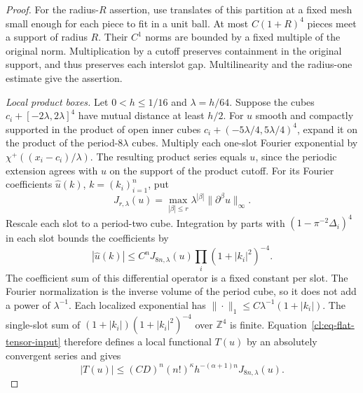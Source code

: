 \documentclass[11pt,letterpaper,reqno]{amsart}
\numberwithin{equation}{section}
\theoremstyle{definition}
\theoremstyle{remark}
\begin{document}
\begin{proof}
For the radius-\(R\) assertion, use translates of this partition
at a fixed mesh small enough for each piece to fit in a unit
ball. At most \(C(1+R)^4\) pieces meet a support of radius \(R\).
Their \(C^1\) norms are bounded by a fixed multiple of the original
norm. Multiplication by a cutoff preserves containment in the
original support, and thus preserves each interslot gap.
Multilinearity and the radius-one estimate give the assertion.

\emph{Local product boxes.}
Let \(0<h\le1/16\) and \(\lambda=h/64\).
Suppose the cubes \(c_i+[-2\lambda,2\lambda]^4\) have mutual
distance at least \(h/2\). For \(u\) smooth and compactly
supported in the product of open inner cubes
\(c_i+(-5\lambda/4,5\lambda/4)^4\),
expand it on the product of the period-\(8\lambda\) cubes.
Multiply each one-slot Fourier exponential by
\(\chi^+((x_i-c_i)/\lambda)\). The resulting product series
equals \(u\), since the periodic extension agrees with \(u\)
on the support of the product cutoff.
For its Fourier coefficients \(\widehat u(k)\),
\(k=(k_i)_{i=1}^n\), put
\[
 J_{r,\lambda}(u)=
     \max_{|\beta|\le r}\lambda^{|\beta|}
                   \|\partial^\beta u\|_\infty .
\]
Rescale each slot to a period-two cube. Integration by parts with
\((1-\pi^{-2}\Delta_i)^4\) in each slot bounds the coefficients by
\[
 |\widehat u(k)|\le C^n J_{8n,\lambda}(u)
                    \prod_i(1+|k_i|^2)^{-4}.
\]
The coefficient sum of this differential operator is a fixed
constant per slot. The Fourier normalization is the inverse
volume of the period cube, so it does not add a power of
\(\lambda^{-1}\). Each localized exponential has
\(\|\cdot\|_1\le C\lambda^{-1}(1+|k_i|)\).
The single-slot sum of \((1+|k_i|)(1+|k_i|^2)^{-4}\)
over \(\mathbb Z^4\) is finite. Equation~\ref{cl:eq-flat-tensor-input} therefore defines a local
functional \(T(u)\) by an absolutely convergent series and gives
\begin{equation}\label{cl:eq-flat-box-bound}
 |T(u)|\le (CD)^n(n!)^\kappa
                  h^{-(\alpha+1)n}J_{8n,\lambda}(u).
\end{equation}


\end{proof}
\end{document}
